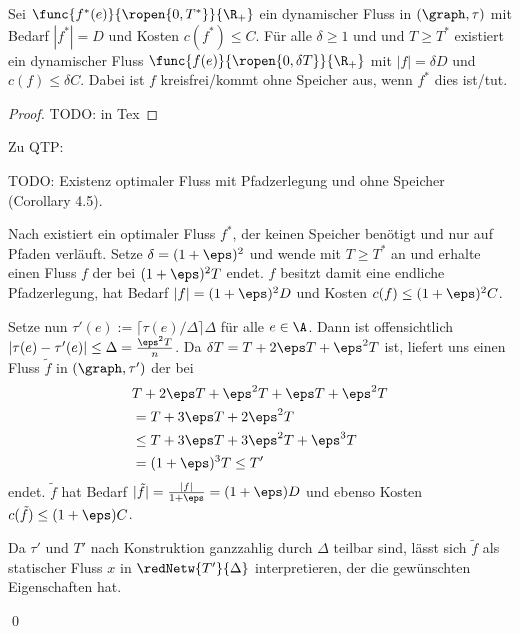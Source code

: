 \begin{lemma}\label{lem:relaxed_flow}
    Sei $\func{f^*(e)}{\ropen{0,T^*}}{\R_+}$ ein dynamischer Fluss in $(\graph, \tau)$
    mit Bedarf $|f^*| = D$ und Kosten $c(f^*) \leq C$. Für alle $\delta \geq 1$ und
    und $T \geq T^*$ existiert ein dynamischer Fluss
    $\func{f(e)}{\ropen{0, \delta T}}{\R_+}$ mit $|f| = \delta D$ und
    $c(f) \leq \delta C$. Dabei ist $f$ kreisfrei/kommt ohne Speicher aus, wenn $f^*$
    dies ist/tut.
    
    \begin{proof}
        TODO: in Tex
    \end{proof}
\end{lemma}

Zu QTP:
\begin{theorem}\label{theo:qtp_opt_flow}
    TODO: Existenz optimaler Fluss mit Pfadzerlegung und ohne Speicher
     (Corollary 4.5).
\end{theorem}

\begin{standaloneProof}
    Nach  existiert ein optimaler Fluss $f^*$, der
    keinen Speicher benötigt und nur auf Pfaden verläuft.
    Setze $\delta = (1 + \eps)^2$ und wende  mit
    $T \geq T^*$ an und erhalte einen Fluss $f$ der bei $(1 + \eps)^2 T$ endet.
    $f$ besitzt damit eine endliche Pfadzerlegung, hat Bedarf
    $|f| = (1 + \eps)^2 D$ und Kosten $c(f) \leq (1 + \eps)^2 C$.
    
    Setze nun $\tau'(e) := \lceil \tau(e) / \Delta \rceil \Delta$ für
    alle $e \in \A$. Dann ist offensichtlich
    $|\tau(e) - \tau'(e)| \leq \Delta = \frac{\eps^2 T}{n}$.
    Da $\delta T = T + 2 \eps T + \eps^2 T$ ist, liefert
     uns einen Fluss $\tilde{f}$ in $(\graph, \tau')$
    der bei
    \begin{align*}
        & T + 2 \eps T + \eps^2 T + \eps T + \eps^2 T \\
        & = T + 3 \eps T + 2 \eps^2 T \\
        & \leq T + 3 \eps T + 3 \eps^2 T + \eps^3 T \\
        & = (1 + \eps)^3 T \leq T'
    \end{align*}
    endet. $\tilde{f}$ hat Bedarf
    $|\tilde{f}| = \frac{|f|}{1+\eps} = (1 + \eps) D$ und ebenso
    Kosten $c(\tilde{f}) \leq (1 + \eps) C$.
    
    Da $\tau'$ und $T'$ nach Konstruktion ganzzahlig durch
    $\Delta$ teilbar sind, lässt sich $\tilde{f}$ als statischer Fluss $x$ in
    $\redNetw{T'}{\Delta}$ interpretieren, der die gewünschten
    Eigenschaften hat.
    
    \begin{flushright}\qed \end{flushright}
\end{standaloneProof}


